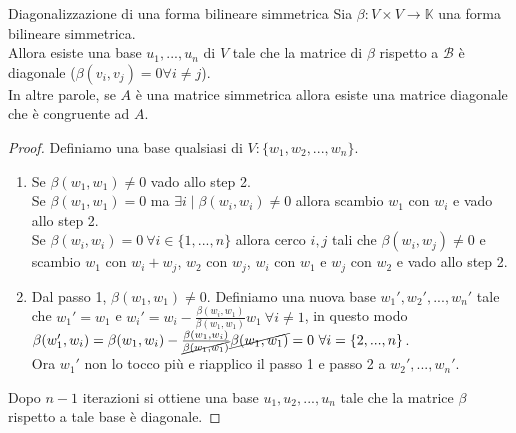 \documentclass[a4paper]{article}
\theoremstyle{definition}
\begin{document}
	\begin{teo}{Diagonalizzazione di una forma bilineare simmetrica}{}
		Sia $\beta: V \times V \to \mathbb{K}$ una forma bilineare simmetrica. \\
		Allora esiste una base $u_1, ..., u_n$ di $V$ tale che la matrice di $\beta$ rispetto a $\mathcal{B}$ è diagonale ($\beta(v_i, v_j) = 0 \forall i \ne j$). \\
		In altre parole, se $A$ è una matrice simmetrica allora esiste una matrice diagonale che è congruente ad $A$.
	\end{teo}
	\begin{proof}
		Definiamo una base qualsiasi di $V: \{w_1, w_2, ..., w_n\}$.
		\begin{enumerate}
			\item Se $\beta(w_1, w_1) \ne 0$ vado allo step 2. \\
			Se $\beta(w_1, w_1) = 0$ ma $\exists i \mid \beta(w_i, w_i) \ne 0$ allora scambio $w_1$ con $w_i$ e vado allo step 2. \\
			Se $\beta(w_i, w_i) = 0 \ \forall i \in \{ 1, ..., n \}$ allora cerco $i, j$ tali che $\beta(w_i, w_j) \ne 0$ e scambio $w_1$ con $w_i + w_j$, $w_2$ con $w_j$, $w_i$ con $w_1$ e $w_j$ con $w_2$ e vado allo step 2.
			\item Dal passo 1, $\beta(w_1, w_1) \ne 0$. Definiamo una nuova base $w_1', w_2', ..., w_n'$ tale che $w_1' = w_1$ e $w_i' = w_i - \frac{\beta(w_i, w_1)}{\beta(w_1, w_1)}w_1 \ \forall i \ne 1$,
			in questo modo $\beta(w_1', w_i) = \beta(w_1, w_i) - \frac{\beta(w_1, w_i)}{\cancel{\beta(w_1, w_1)}}\cancel{\beta(w_1, w_1)} = 0 \ \forall i = \{2, ..., n\}$. \\
			Ora $w_1'$ non lo tocco più e riapplico il passo 1 e passo 2 a $w_2', ..., w_n'$.
		\end{enumerate}
		Dopo $n - 1$ iterazioni si ottiene una base $u_1, u_2, ..., u_n$ tale che la matrice $\beta$ rispetto a tale base è diagonale.
	\end{proof}
\end{document}
